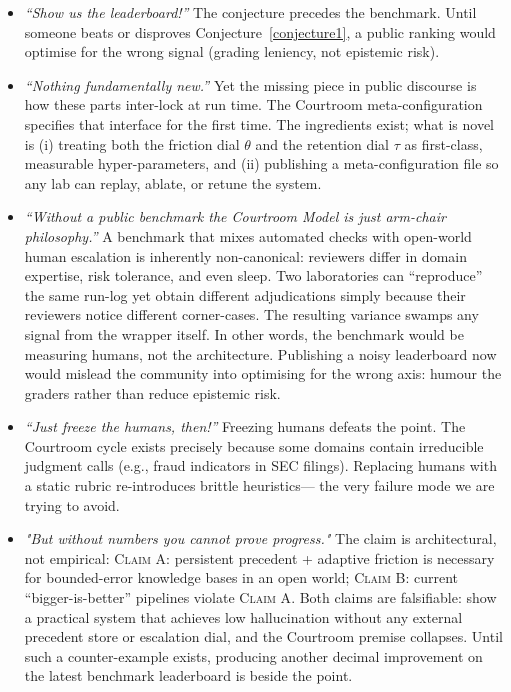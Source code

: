 \documentclass[11pt]{article}
\begin{document}
\begin{itemize}
\item \emph{“Show us the leaderboard!”} The conjecture precedes the benchmark. Until someone beats or disproves Conjecture~\ref{conjecture1}, a public ranking would optimise for the wrong signal (grading leniency, not epistemic risk).

\item \emph{“Nothing fundamentally new.”} Yet the missing piece in public discourse is how these parts inter-lock at run time. The Courtroom meta-configuration specifies that interface for the first time. The ingredients exist; what is novel is (i) treating both the friction dial $\theta$ and the retention dial $\tau$ as first-class, measurable hyper-parameters, and (ii) publishing a meta-configuration file so any lab can replay, ablate, or retune the system.

\item \emph{“Without a public benchmark the Courtroom Model is just arm-chair philosophy.”} A benchmark that mixes automated checks with open-world human escalation is inherently non-canonical: reviewers differ in domain expertise, risk tolerance, and even sleep. Two laboratories can “reproduce” the same run-log yet obtain different adjudications simply because their reviewers notice different corner-cases. The resulting variance swamps any signal from the wrapper itself. In other words, the benchmark would be measuring humans, not the architecture. Publishing a noisy leaderboard now would mislead the community into optimising for the wrong axis: humour the graders rather than reduce epistemic risk.

\item \emph{“Just freeze the humans, then!”} Freezing humans defeats the point. The Courtroom cycle exists precisely because some domains contain irreducible judgment calls (e.g., fraud indicators in SEC filings). Replacing humans with a static rubric re-introduces brittle heuristics— the very failure mode we are trying to avoid.

\item \emph{"But without numbers you cannot prove progress."} The claim is architectural, not empirical: \textsc{Claim A}: persistent precedent + adaptive friction is necessary for bounded-error knowledge bases in an open world; \textsc{Claim B}: current “bigger-is-better” pipelines violate \textsc{Claim A}. Both claims are falsifiable: show a practical system that achieves low hallucination without any external precedent store or escalation dial, and the Courtroom premise collapses. Until such a counter-example exists, producing another decimal improvement on the latest benchmark leaderboard is beside the point.


\end{itemize}
\end{document}
